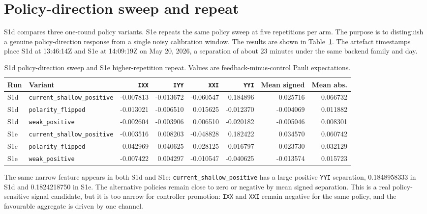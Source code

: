 \documentclass[preprint,aps,physrev,superscriptaddress,floatfix,longbibliography]{revtex4-2}
\begin{document}
\section{Policy-direction sweep and repeat}

S1d compares three one-round policy variants. S1e repeats the same policy
sweep at five repetitions per arm. The purpose is to distinguish a genuine
policy-direction response from a single noisy calibration window. The results
are shown in Table~\ref{tab:s1de}. The artefact timestamps place S1d at
13:46:14Z and S1e at 14:09:19Z on May 20, 2026, a separation of about
23 minutes under the same backend family and day.

\begin{table}[tb]
\centering
\scriptsize
\begin{tabular}{@{}llrrrrrr@{}}
\toprule
Run & Variant & \texttt{IXX} & \texttt{IYY} & \texttt{XXI} & \texttt{YYI} & Mean signed & Mean abs. \\
\midrule
S1d & \texttt{current\_shallow\_positive} & -0.007813 & -0.013672 & -0.060547 & 0.184896 & 0.025716 & 0.066732 \\
S1d & \texttt{polarity\_flipped} & -0.013021 & -0.006510 & 0.015625 & -0.012370 & -0.004069 & 0.011882 \\
S1d & \texttt{weak\_positive} & -0.002604 & -0.003906 & 0.006510 & -0.020182 & -0.005046 & 0.008301 \\
\midrule
S1e & \texttt{current\_shallow\_positive} & -0.003516 & 0.008203 & -0.048828 & 0.182422 & 0.034570 & 0.060742 \\
S1e & \texttt{polarity\_flipped} & -0.042969 & -0.040625 & -0.028125 & 0.016797 & -0.023730 & 0.032129 \\
S1e & \texttt{weak\_positive} & -0.007422 & 0.004297 & -0.010547 & -0.040625 & -0.013574 & 0.015723 \\
\bottomrule
\end{tabular}
\caption{S1d policy-direction sweep and S1e higher-repetition repeat. Values
are feedback-minus-control Pauli expectations.}
\label{tab:s1de}
\end{table}

The same narrow feature appears in both S1d and S1e:
\texttt{current\_shallow\_positive} has a large positive \texttt{YYI}
separation, 0.1848958333 in S1d and 0.1824218750 in S1e. The alternative
policies remain close to zero or negative by mean signed separation. This is a
real policy-sensitive signal candidate, but it is too narrow for controller
promotion: \texttt{IXX} and \texttt{XXI} remain negative for the same policy,
and the favourable aggregate is driven by one channel.
\end{document}
